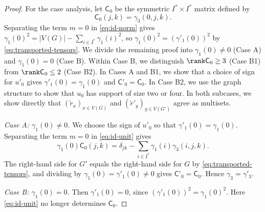 \begin{proof}
  For the case analysis, let $\mathsf C_0$ be the symmetric
  $I^*\times I^*$ matrix defined by
  \begin{equation}\label{eq:unknowns}
    \mathsf C_0(j,k) = \gamma_3(0,j,k).
  \end{equation}
  Separating the term $m=0$ in \cref{eq:id-norm} gives
  $\gamma_1(0)^2=|V(G)|-\sum_{i\in I^*}\gamma_1(i)^2$, so
  $\gamma_1(0)^2=(\gamma'_1(0))^2$ by \cref{eq:transported-tensors}.
  We divide the remaining proof into $\gamma_1(0)\ne0$ (Case A)
  and $\gamma_1(0)=0$ (Case B).
  Within Case B, we distinguish $\rank\mathsf C_0\geq3$ (Case B1)
  from $\rank\mathsf C_0\leq2$ (Case B2).
  In Cases A and B1, we show that a choice of sign for $u'_0$ gives
  $\gamma'_1(0)=\gamma_1(0)$ and $\mathsf C'_0=\mathsf C_0$.
  In Case B2, we use the graph structure to show that $u_0$ has
  support of size two or four. In both subcases, we show directly
  that $(\tilde{r}_x)_{x\in V(G)}$ and $(\tilde{r}'_y)_{y\in V(G')}$ agree as multisets.

  \emph{Case A: $\gamma_1(0) \neq 0$.} We choose the sign of $u'_0$ so
  that $\gamma'_1(0)=\gamma_1(0)$. Separating the term $m=0$ in
  \cref{eq:id-unit} gives
  \begin{equation}
    \label{eq:caseA}
    \gamma_1(0) \mathsf{C}_0(j,k) = \delta_{jk} - \sum_{i \in I^{*}} \gamma_1(i) \gamma_3(i,j,k).
  \end{equation}
  The right-hand side for $G'$ equals the right-hand side for $G$ by
  \cref{eq:transported-tensors}, and dividing by
  $\gamma_1(0)=\gamma'_1(0)\neq0$ gives $\mathsf C'_0=\mathsf C_0$.
  Hence $\gamma_3=\gamma'_3$.

  \emph{Case B: $\gamma_1(0) = 0$.} Then $\gamma'_1(0)=0$, since
  $(\gamma'_1(0))^2=\gamma_1(0)^2$. Here \cref{eq:id-unit} no longer
  determines $\mathsf C_0$.


\end{proof}
